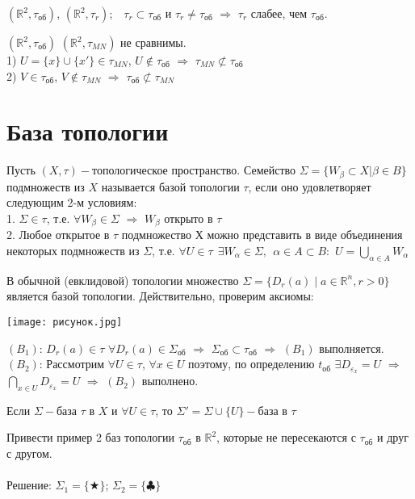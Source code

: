 \begin{example}
$(\mathbb{R}^2,\tau_{\text{об}})$, $(\mathbb{R}^2,\tau_{r})$;\ \ 
$\tau_{r}{\subset}\tau_{\text{об}}$ и $\tau_{r}{\neq}\tau_{\text{об}}$ $\Rightarrow$ $\tau_r$ слабее, чем $\tau_{\text{об}}$.
\end{example}

\begin{example}
$(\mathbb{R}^2,\tau_{\text{об}})$ $(\mathbb{R}^2,\tau_{MN})$ не сравнимы.\\
1) $U=\{x\}{\cup}\{x'\}{\in}\tau_{MN}$, $U{\notin}\tau_{\text{об}}$ $\Rightarrow$ $\tau_{MN}{\not\subset}\tau_{\text{об}}$\\
2) $V{\in}\tau_{\text{об}}$, $V{\notin}\tau_{MN}$ $\Rightarrow$ $\tau_{\text{об}}{\not\subset}\tau_{MN}$
\end{example}

\section{База топологии}
\begin{definition}
Пусть $(X,\tau)-$топологическое пространство. Семейство $\Sigma=\{W_\beta{\subset}X|\beta{\in}B\}$ подмножеств из $X$ называется базой топологии $\tau$, если оно удовлетворяет следующим 2-м условиям:\\
    1. $\Sigma\in\tau$, т.е. $\forall W_\beta\in\Sigma$ $\Rightarrow$ $W_{\beta}$ открыто в $\tau$\\
    2. Любое открытое в $\tau$ подмножество $Х$ можно представить в виде
    объединения некоторых подмножеств из $\Sigma$, т.е. 
    $\forall U\in\tau\ \ \exists W_\alpha\in\Sigma,\ \ \alpha\in A\subset B:$
    $U=\bigcup\limits_{\alpha\in A}W_\alpha $
\end{definition}
\begin{example} 
В обычной (евклидовой) топологии множество 
$\Sigma=\{D_r(a)\mid a\in\mathbb{R}^n,r>0\}$ является базой топологии.
Действительно, проверим аксиомы:\\
\begin{center}
{\texttt{[image: рисунок.jpg]}}
\end{center}
$(B_1)$: $D_r(a){\in}\tau$ $\forall D_r(a){\in}\Sigma_{\text{об}}$ $\Rightarrow$ $\Sigma_{\text{об}}{\subset}\tau_{\text{об}}$ $\Rightarrow$ $(B_1)$ выполняется.\\
$(B_2)$: Рассмотрим $\forall U{\in}\tau$, $\forall x{\in}U$ поэтому, по определению $t_{\text{об}}$ $\exists D_{\varepsilon_{x}}=U$ $\Rightarrow$ $\bigcap\limits_{x{\in}U}D_{\varepsilon_x}=U$ $\Rightarrow$ $(B_2)$ выполнено.
\end{example}
\begin{remark}
Если $\Sigma-$база $\tau$ в $X$ и $\forall U{\in}\tau$, то $\Sigma'=\Sigma{\cup}\{U\}-$база в $\tau$
\end{remark}
\begin{exercise}
Привести пример 2 баз топологии $\tau_{\text{об}}$ в $\mathbb{R}^2$, которые не пересекаются с $\tau_{об}$ и друг с другом.\\
\\
Решение: $\Sigma_1=\{\bigstar\}$; $\Sigma_2=\{\clubsuit\}$
\end{exercise}

